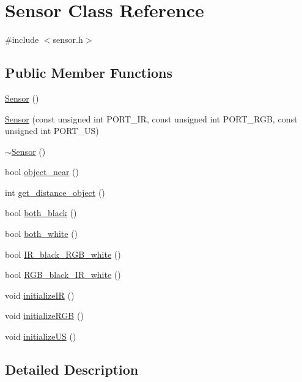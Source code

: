 \hypertarget{class_sensor}{}\section{Sensor Class Reference}
\label{class_sensor}


{\ttfamily \#include $<$sensor.\+h$>$}

\subsection*{Public Member Functions}
\begin{DoxyCompactItemize}
\item 
\mbox{\hyperlink{class_sensor_a342d6d11ef572c8cba92cb76fb1a294b}{Sensor}} ()
\item 
\mbox{\hyperlink{class_sensor_a47122c90fb62cd4510af51161058953d}{Sensor}} (const unsigned int P\+O\+R\+T\+\_\+\+IR, const unsigned int P\+O\+R\+T\+\_\+\+R\+GB, const unsigned int P\+O\+R\+T\+\_\+\+US)
\item 
\mbox{\hyperlink{class_sensor_aee8c70e7ef05ce65e7ee33686b5d7db2}{$\sim$\+Sensor}} ()
\item 
bool \mbox{\hyperlink{class_sensor_a4f797e3f6a549cfdefab639eb6a86787}{object\+\_\+near}} ()
\item 
int \mbox{\hyperlink{class_sensor_a118f38dcb8a695ad78b7c7d94f508d4f}{get\+\_\+distance\+\_\+object}} ()
\item 
bool \mbox{\hyperlink{class_sensor_a32ebdbb3ba6fbe19739a10b17dc11cba}{both\+\_\+black}} ()
\item 
bool \mbox{\hyperlink{class_sensor_add2279da6d407ed7678064ab1fe7d02d}{both\+\_\+white}} ()
\item 
bool \mbox{\hyperlink{class_sensor_a03b8f6886c672badadfeef89d069e1ea}{I\+R\+\_\+black\+\_\+\+R\+G\+B\+\_\+white}} ()
\item 
bool \mbox{\hyperlink{class_sensor_aa75ec0ed5bd2782f726f7e01796b2285}{R\+G\+B\+\_\+black\+\_\+\+I\+R\+\_\+white}} ()
\item 
void \mbox{\hyperlink{class_sensor_a7065fe2dff6107b89d162e59271a9491}{initialize\+IR}} ()
\item 
void \mbox{\hyperlink{class_sensor_a1684cc490c5dd360890d2c0cdfd23fd3}{initialize\+R\+GB}} ()
\item 
void \mbox{\hyperlink{class_sensor_a77a538443f5e024bbd144cc56eed3319}{initialize\+US}} ()
\end{DoxyCompactItemize}


\subsection{Detailed Description}


